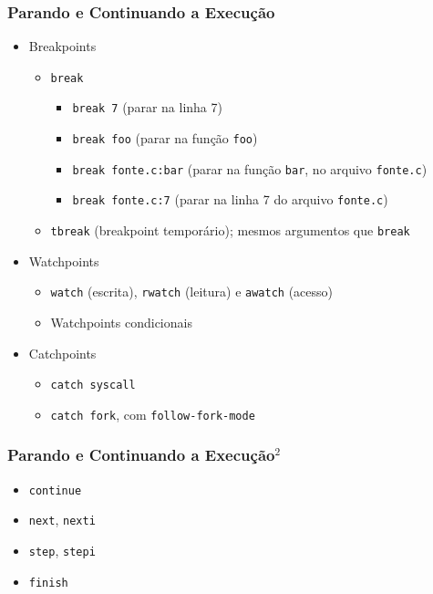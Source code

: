 \documentclass[xcolor=pdftex,dvipsnames,table,t]{beamer}
\begin{document}
\begin{frame}[fragile]
	\frametitle{Parando e Continuando a Execução}
	  \begin{itemize}
	    \item{Breakpoints}
	      \begin{itemize}
		\item{\verb|break|}
		  \begin{itemize}
		    \item{\verb|break 7| (parar na linha 7)}
		    \item{\verb|break foo| (parar na função \verb|foo|)}
		    \item{\verb|break fonte.c:bar| (parar na função \verb|bar|, no arquivo \verb|fonte.c|)}
		    \item{\verb|break fonte.c:7| (parar na linha 7 do arquivo \verb|fonte.c|)}
		  \end{itemize}
		\item{\verb|tbreak| (breakpoint temporário); mesmos argumentos que \verb|break|}
	      \end{itemize}
	    \item{Watchpoints}
	      \begin{itemize}
		\item{\verb|watch| (escrita), \verb|rwatch| (leitura) e \verb|awatch| (acesso)}
		\item{Watchpoints condicionais}
	      \end{itemize}
	    \item{Catchpoints}
	      \begin{itemize}
		\item{\verb|catch syscall|}
		\item{\verb|catch fork|, com \verb|follow-fork-mode|}
	      \end{itemize}
	  \end{itemize}
\end{frame}

\begin{frame}[fragile]
	\frametitle{Parando e Continuando a Execução$^2$}
	  \begin{itemize}
	    \item{\verb|continue|}
	    \item{\verb|next|, \verb|nexti|}
	    \item{\verb|step|, \verb|stepi|}
	    \item{\verb|finish|}
	  \end{itemize}
\end{frame}
\end{document}

